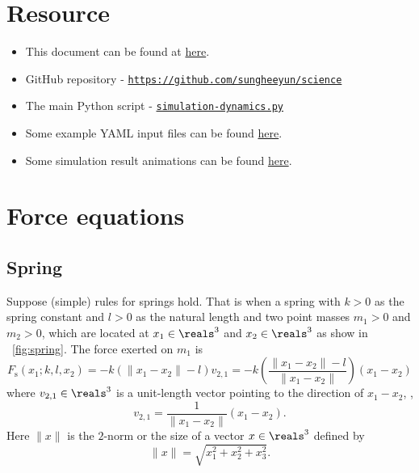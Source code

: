 \documentclass{article}
\begin{document}
\section{Resource}

\begin{itemize}
\item
	This document can be found at \href{https://github.com/sungheeyun/science/blob/main/docs/dynamics-equations.pdf}{here}.

\item
	GitHub repository - {\tt \href{https://github.com/sungheeyun/science}{https://github.com/sungheeyun/science}}

\item
	The main Python script - {\tt \href{https://github.com/sungheeyun/science/blob/main/bin/simulation-dynamics.py}{simulation-dynamics.py}}

\item
	Some example YAML input files can be found \href{https://github.com/sungheeyun/science/tree/main/data/input}{here}.

\item
	Some simulation result animations can be found \href{https://github.com/sungheeyun/science/tree/main/animations}{here}.
\end{itemize}


\section{Force equations}

\subsection{Spring}

Suppose (simple) rules for springs hold. That is when a spring with $k>0$ as the spring constant and $l>0$ as the natural length
and two point masses $m_1>0$ and $m_2>0$, which are located at
$x_1\in\reals^3$
and
$x_2\in\reals^3$
as show in \figurename~\ref{fig:spring}.
The force exerted on $m_1$ is
\begin{equation}
\label{eq:force:spring}
	F_\mathrm{s}(x_1;k,l,x_2) = -k (\|x_1-x_2\| - l) v_{2,1}
	= -k
	\left(
	\frac{\|x_1-x_2\| - l}{\|x_1-x_2\|}
	\right)
	(x_1-x_2)
\end{equation}
where $v_{2,1}\in\reals^3$ is a unit-length vector pointing to the direction of $x_1-x_2$,
\ie,
\[
	v_{2,1} =
	\frac{1}{\|x_1-x_2\|}
	(x_1-x_2).
\]
Here $\|x\|$ is the $2$-norm or the size of a vector $x\in\reals^3$ defined by
\[
	\|x\| = \sqrt{x_1^2+x_2^2+x_3^2}.
\]
\end{document}
